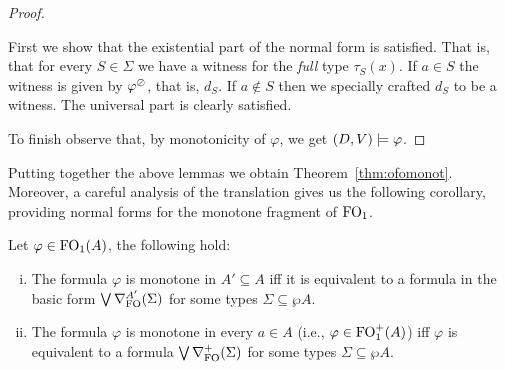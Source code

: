 \begin{proof}
\begin{pfclaim}
First we show that the existential part of the normal form is satisfied. That is, that for every $S\in \Sigma$ we have a witness for the \emph{full} type $\tau_S(x)$. If $a\in S$ the witness is given by $\varphi^\oslash$, that is, $d_S$. If $a \notin S$ then we specially crafted $d_S$ to be a witness. The universal part is clearly satisfied.
\end{pfclaim}
%
To finish observe that, by monotonicity of $\varphi$, we get $(D,V) \models \varphi$. %
\end{proof}

Putting together the above lemmas we obtain Theorem~\ref{thm:ofomonot}. Moreover, a careful analysis of the translation gives us the following corollary, providing normal forms for the monotone fragment of $\mathrm{FO}_1$.

\begin{corollary}\label{cor:ofopositivenf} Let $\varphi \in \mathrm{FO}_1(A)$, the following hold:
	\begin{enumerate}[(i)]
		\item The formula $\varphi$ is monotone in $A' \subseteq A$ iff it is equivalent to a formula in the basic form $\bigvee \nabla^{A'}_\mathrm{FO}(\Sigma)$ for some types $\Sigma \subseteq \wp A$.
		\item The formula $\varphi$ is monotone in every $a\in A$ (i.e., $\varphi\in\mathrm{FO}_1^+(A)$) iff $\varphi$ is equivalent to a formula $\bigvee \nabla^+_{\mathrm{FO}}(\Sigma)$ for some types $\Sigma \subseteq \wp A$. %
	\end{enumerate}
\end{corollary}


